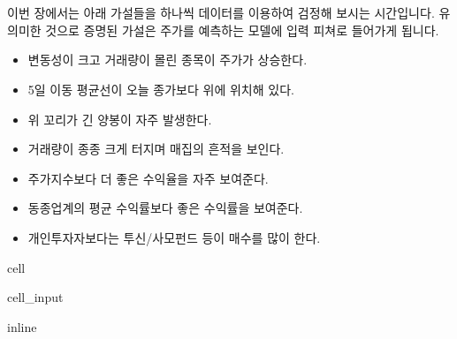 \documentclass[letterpaper,10pt,english]{jupyterBook}
\begin{document}
\chapter{}
\label{\detokenize{chapter5/5.1.0_Hypothesis:id1}}\label{\detokenize{chapter5/5.1.0_Hypothesis::doc}}
\sphinxAtStartPar
이번 장에서는 아래 가설들을 하나씩 데이터를 이용하여 검정해 보시는 시간입니다. 유의미한 것으로 증명된 가설은 주가를 예측하는 모델에 입력 피쳐로 들어가게 됩니다.
\begin{itemize}
\item {} 
\sphinxAtStartPar
변동성이 크고 거래량이 몰린 종목이 주가가 상승한다.

\item {} 
\sphinxAtStartPar
5일 이동 평균선이 오늘 종가보다 위에 위치해 있다.

\item {} 
\sphinxAtStartPar
위 꼬리가 긴 양봉이 자주 발생한다.

\item {} 
\sphinxAtStartPar
거래량이 종종 크게 터지며 매집의 흔적을 보인다.

\item {} 
\sphinxAtStartPar
주가지수보다 더 좋은 수익율을 자주 보여준다.

\item {} 
\sphinxAtStartPar
동종업계의 평균 수익률보다 좋은 수익률을 보여준다.

\item {} 
\sphinxAtStartPar
개인투자자보다는 투신/사모펀드 등이 매수를 많이 한다.

\end{itemize}

\begin{sphinxuseclass}{cell}\begin{sphinxVerbatimInput}

\begin{sphinxuseclass}{cell_input}
\begin{sphinxVerbatim}[commandchars=\\\{\}]
   
 inline
   
   
   
  
\end{sphinxVerbatim}

\end{sphinxuseclass}\end{sphinxVerbatimInput}

\end{sphinxuseclass}
\end{document}
